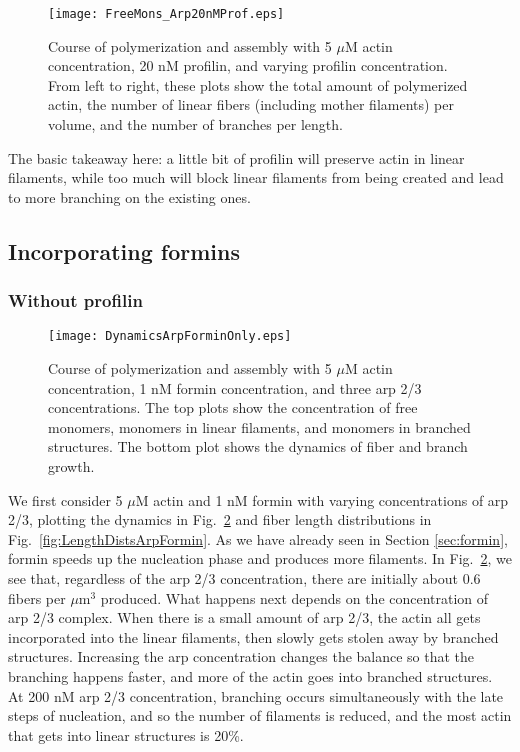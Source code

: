 \documentclass[11pt]{article}
\begin{document}
\begin{figure}
\centering
\texttt{[image: FreeMons\_Arp20nMProf.eps]}
\caption{\label{fig:PolyArp20Prof}Course of polymerization and assembly with 5 $\mu$M actin concentration, 20 nM profilin, and varying profilin concentration. From left to right, these plots show the total amount of polymerized actin, the number of linear fibers (including mother filaments) per volume, and the number of branches per length.   }
\end{figure}

The basic takeaway here: a little bit of profilin will preserve actin in linear filaments, while too much will block linear filaments from being created and lead to more branching on the existing ones.


\subsection{Incorporating formins}

\subsubsection{Without profilin}
\begin{figure}
\centering
\texttt{[image: DynamicsArpForminOnly.eps]}
\caption{\label{fig:ArpFormin}Course of polymerization and assembly with 5 $\mu$M actin concentration, 1 nM formin concentration, and three arp 2/3 concentrations. The top plots show the concentration of free monomers, monomers in linear filaments, and monomers in branched structures. The bottom plot shows the dynamics of fiber and branch growth. }
\end{figure}

We first consider 5 $\mu$M actin and 1 nM formin with varying concentrations of arp 2/3, plotting the dynamics in Fig.\ \ref{fig:ArpFormin} and fiber length distributions in Fig.\ \ref{fig:LengthDistsArpFormin}. As we have already seen in Section \ref{sec:formin}, formin speeds up the nucleation phase and produces more filaments. In Fig.\ \ref{fig:ArpFormin}, we see that, regardless of the arp 2/3 concentration, there are initially about 0.6 fibers per $\mu$m$^3$ produced. What happens next depends on the concentration of arp 2/3 complex. When there is a small amount of arp 2/3, the actin all gets incorporated into the linear filaments, then slowly gets stolen away by branched structures. Increasing the arp concentration changes the balance so that the branching happens faster, and more of the actin goes into branched structures. At 200 nM arp 2/3 concentration, branching occurs simultaneously with the late steps of nucleation, and so the number of filaments is reduced, and the most actin that gets into linear structures is 20\%. 
\end{document}
